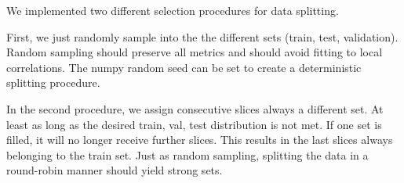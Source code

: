 We implemented two different selection procedures for data splitting.

First, we just randomly sample into the the different sets (train, test, validation). Random sampling should preserve all metrics and should avoid fitting to local correlations. The numpy random seed can be set to create a deterministic splitting procedure.

In the second procedure, we assign consecutive slices always a different set. At least as long as the desired train, val, test distribution is not met. If one set is filled, it will no longer receive further slices. This results in the last slices always belonging to the train set. Just as random sampling, splitting the data in a round-robin manner should yield strong sets.